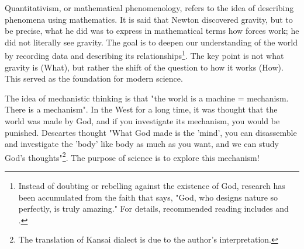 \documentclass{ltjsbook}
\begin{document}
Quantitativism, or mathematical phenomenology, refers to the idea of describing phenomena using mathematics. It is said that Newton discovered gravity, but to be precise, what he did was to express in mathematical terms how forces work; he did not literally see gravity. The goal is to deepen our understanding of the world by recording data and describing its relationships\footnote{Instead of doubting or rebelling against the existence of God, research has been accumulated from the faith that says, "God, who designs nature so perfectly, is truly amazing." For details, recommended reading includes \textcite{IkeuchiR2014} and \textcite{Hebizo2016}.}. The key point is not what gravity is (What), but rather the shift of the question to how it works (How). This served as the foundation for modern science.


The idea of mechanistic thinking is that "the world is a machine = mechanism. There is a mechanism". In the West for a long time, it was thought that the world was made by God, and if you investigate its mechanism, you would be punished. Descartes thought "What God made is the 'mind', you can disassemble and investigate the 'body' like body as much as you want, and we can study God's thoughts"\footnote{The translation of Kansai dialect is due to the author's interpretation.}.
The purpose of science is to explore this mechanism!
\end{document}
